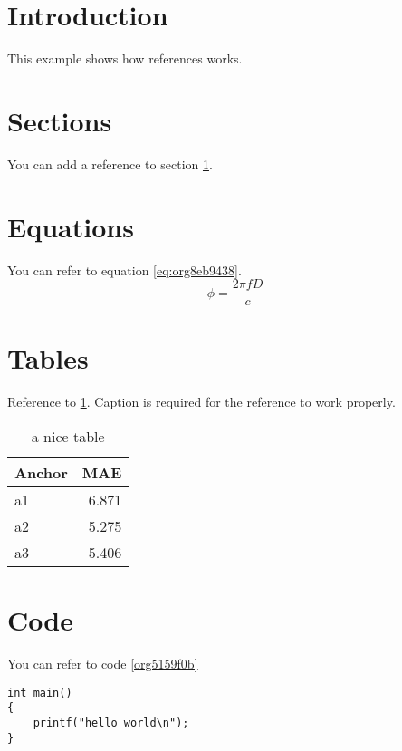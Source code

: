 


\section{Introduction}
\label{sec:orgf337df7}
This example shows how references works.

\section{Sections}
\label{sec:org3661139}
You can add a reference to section \ref{sec:orgf337df7}.

\section{Equations}
\label{sec:org1744517}
You can refer to equation \ref{eq:org8eb9438}.
\begin{equation}
\label{eq:org8eb9438}
\phi = \frac{2\pi fD}{c}
\end{equation}

\section{Tables}
\label{sec:org1dd2bc6}
Reference to \ref{tab:orgf9a7783}.
Caption is required for the reference to work properly.

\begin{table}[htbp]
\caption{\label{tab:orgf9a7783}
a nice table}
\centering
\begin{tabular}{lr}
Anchor & MAE\\
\hline
a1 & 6.871\\
a2 & 5.275\\
a3 & 5.406\\
\end{tabular}
\end{table}

\section{Code}
\label{sec:org707dc6a}
You can refer to code \ref{org5159f0b}

\begin{verbatim}
int main()
{
    printf("hello world\n");
}
\end{verbatim}


